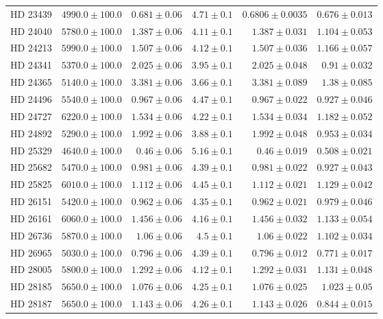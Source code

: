 \begin{longtable*}{lrrrrr}
HD 23439 & $4990.0\pm 100.0$ & $0.681\pm 0.06$ & $4.71\pm 0.1$ & $0.6806\pm 0.0035$ & $0.676\pm 0.013$ \\ 
HD 24040 & $5780.0\pm 100.0$ & $1.387\pm 0.06$ & $4.11\pm 0.1$ & $1.387\pm 0.031$ & $1.104\pm 0.053$ \\ 
HD 24213 & $5990.0\pm 100.0$ & $1.507\pm 0.06$ & $4.12\pm 0.1$ & $1.507\pm 0.036$ & $1.166\pm 0.057$ \\ 
HD 24341 & $5370.0\pm 100.0$ & $2.025\pm 0.06$ & $3.95\pm 0.1$ & $2.025\pm 0.048$ & $0.91\pm 0.032$ \\ 
HD 24365 & $5140.0\pm 100.0$ & $3.381\pm 0.06$ & $3.66\pm 0.1$ & $3.381\pm 0.089$ & $1.38\pm 0.085$ \\ 
HD 24496 & $5540.0\pm 100.0$ & $0.967\pm 0.06$ & $4.47\pm 0.1$ & $0.967\pm 0.022$ & $0.927\pm 0.046$ \\ 
HD 24727 & $6220.0\pm 100.0$ & $1.534\pm 0.06$ & $4.22\pm 0.1$ & $1.534\pm 0.034$ & $1.182\pm 0.052$ \\ 
HD 24892 & $5290.0\pm 100.0$ & $1.992\pm 0.06$ & $3.88\pm 0.1$ & $1.992\pm 0.048$ & $0.953\pm 0.034$ \\ 
HD 25329 & $4640.0\pm 100.0$ & $0.46\pm 0.06$ & $5.16\pm 0.1$ & $0.46\pm 0.019$ & $0.508\pm 0.021$ \\ 
HD 25682 & $5470.0\pm 100.0$ & $0.981\pm 0.06$ & $4.39\pm 0.1$ & $0.981\pm 0.022$ & $0.927\pm 0.043$ \\ 
HD 25825 & $6010.0\pm 100.0$ & $1.112\pm 0.06$ & $4.45\pm 0.1$ & $1.112\pm 0.021$ & $1.129\pm 0.042$ \\ 
HD 26151 & $5420.0\pm 100.0$ & $0.962\pm 0.06$ & $4.35\pm 0.1$ & $0.962\pm 0.021$ & $0.979\pm 0.046$ \\ 
HD 26161 & $6060.0\pm 100.0$ & $1.456\pm 0.06$ & $4.16\pm 0.1$ & $1.456\pm 0.032$ & $1.133\pm 0.054$ \\ 
HD 26736 & $5870.0\pm 100.0$ & $1.06\pm 0.06$ & $4.5\pm 0.1$ & $1.06\pm 0.022$ & $1.102\pm 0.034$ \\ 
HD 26965 & $5030.0\pm 100.0$ & $0.796\pm 0.06$ & $4.39\pm 0.1$ & $0.796\pm 0.012$ & $0.771\pm 0.017$ \\ 
HD 28005 & $5800.0\pm 100.0$ & $1.292\pm 0.06$ & $4.12\pm 0.1$ & $1.292\pm 0.031$ & $1.131\pm 0.048$ \\ 
HD 28185 & $5650.0\pm 100.0$ & $1.076\pm 0.06$ & $4.25\pm 0.1$ & $1.076\pm 0.025$ & $1.023\pm 0.05$ \\ 
HD 28187 & $5650.0\pm 100.0$ & $1.143\pm 0.06$ & $4.26\pm 0.1$ & $1.143\pm 0.026$ & $0.844\pm 0.015$ \\ 

\end{longtable*}
